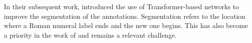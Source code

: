 

In their subsequent work, \textcite{chen2019harmony,chen2021attend} introduced the use of Transformer-based networks \cite{vaswani2017attention} to improve the segmentation of the annotations. Segmentation refers to the location where a Roman numeral label ends and the new one begins. This has also become a priority in the work of \textcite{micchi2021deep} and remains a relevant challenge.
